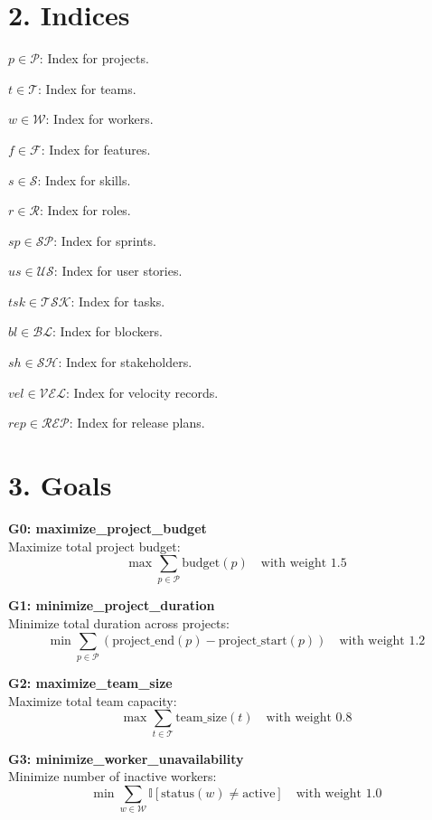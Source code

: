 \documentclass[12pt]{article}
\begin{document}
\section{2. Indices}
\item $p \in \mathcal{P}$: Index for projects.
    \item $t \in \mathcal{T}$: Index for teams.
    \item $w \in \mathcal{W}$: Index for workers.
    \item $f \in \mathcal{F}$: Index for features.
    \item $s \in \mathcal{S}$: Index for skills.
    \item $r \in \mathcal{R}$: Index for roles.
    \item $sp \in \mathcal{SP}$: Index for sprints.
    \item $us \in \mathcal{US}$: Index for user stories.
    \item $tsk \in \mathcal{TSK}$: Index for tasks.
    \item $bl \in \mathcal{BL}$: Index for blockers.
    \item $sh \in \mathcal{SH}$: Index for stakeholders.
    \item $vel \in \mathcal{VEL}$: Index for velocity records.
    \item $rep \in \mathcal{REP}$: Index for release plans.

\section{3. Goals}
\item \textbf{G0: maximize\_project\_budget} \\
    Maximize total project budget: 
    \[
    \max \sum_{p \in \mathcal{P}} \text{budget}(p) \quad \text{with weight } 1.5
    \]

    \item \textbf{G1: minimize\_project\_duration} \\
    Minimize total duration across projects:
    \[
    \min \sum_{p \in \mathcal{P}} \left( \text{project\_end}(p) - \text{project\_start}(p) \right) \quad \text{with weight } 1.2
    \]

    \item \textbf{G2: maximize\_team\_size} \\
    Maximize total team capacity:
    \[
    \max \sum_{t \in \mathcal{T}} \text{team\_size}(t) \quad \text{with weight } 0.8
    \]

    \item \textbf{G3: minimize\_worker\_unavailability} \\
    Minimize number of inactive workers:
    \[
    \min \sum_{w \in \mathcal{W}} \mathbb{I}[\text{status}(w) \neq \text{active}] \quad \text{with weight } 1.0
    \]
\end{document}
